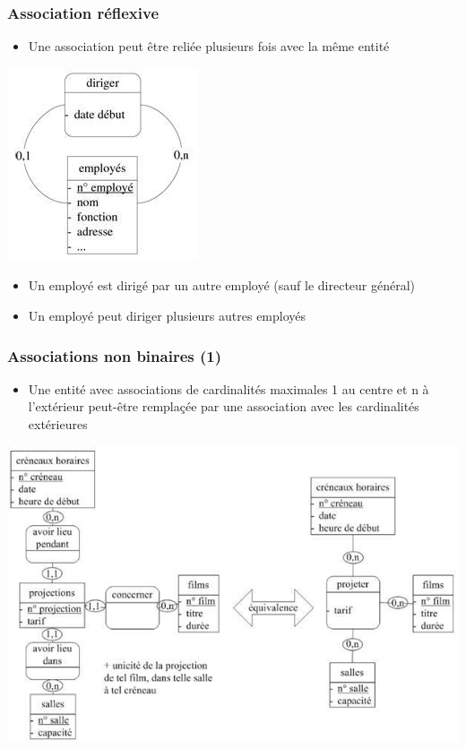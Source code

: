 \begin{frame}
  \frametitle{Association réflexive}
  \begin{itemize}
    \item Une association peut être reliée plusieurs fois avec la même entité
  \end{itemize}
  \begin{center}
    \includegraphics[width=0.35\linewidth]{association_reflexive.jpg}
  \end{center}
  \begin{itemize}
    \item Un employé est dirigé par un autre employé (sauf le directeur général)
    \item Un employé peut diriger plusieurs autres employés
  \end{itemize}
\end{frame}

\begin{frame}
  \frametitle{Associations non binaires (1)}
  \begin{itemize}
    \item Une entité avec associations de cardinalités maximales 1 au centre et n à l'extérieur peut-être
      remplaçée par une association avec les cardinalités extérieures
  \end{itemize}
  \begin{center}
    \includegraphics[width=0.8\linewidth]{assocation_ternaire.jpg}
  \end{center}
\end{frame}

